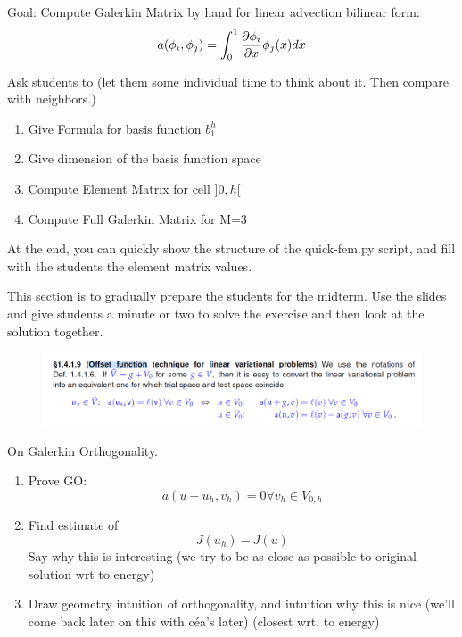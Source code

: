 Goal: Compute Galerkin Matrix by hand for linear advection bilinear form:
$$a(\phi_i, \phi_j) = \int_0^1 \pdv{\phi_i}{x}(x)\phi_j(x)dx$$

Ask students to (let them some individual time to think about it. Then compare with neighbors.)
\begin{enumerate}
    \item Give Formula for basis function $b^h_1$
    \item Give dimension of the basis function space
    \item Compute Element Matrix for cell $]0,h[$
    \item Compute Full Galerkin Matrix for M=3
\end{enumerate}

At the end, you can quickly show the structure of the quick-fem.py script, and fill with the students the element matrix values.

 This section is to gradually prepare the students for the midterm. Use the slides and give students a minute or two to solve the exercise and then look at the solution together.

 
\begin{figure}[h]
    \centering
    \includegraphics{week03/ex_offset_function.png}
\end{figure}

On Galerkin Orthogonality.
\begin{enumerate}
    \item Prove GO: $$a(u-u_h, v_h) = 0 \forall v_h \in V_{0,h}$$
    \item Find estimate of $$J(u_h) - J(u)$$ Say why this is interesting (we try to be as close as possible to original solution wrt to energy)
    \item Draw geometry intuition of orthogonality, and intuition why this is nice (we'll come back later on this with céa's later) (closest wrt. to energy)
\end{enumerate}

